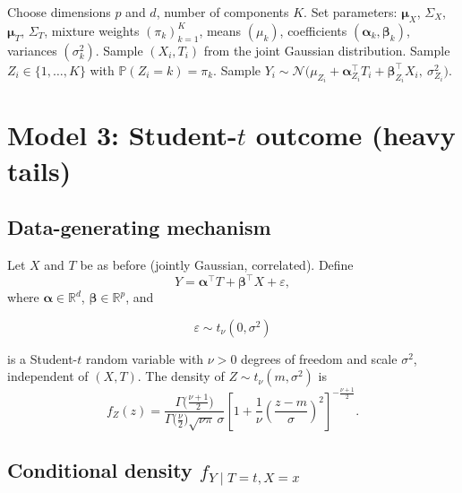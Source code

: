 \documentclass[11pt]{article}
\begin{document}
\begin{algorithm}[h]
\caption{Data generation for the Gaussian mixture model}
\begin{algorithmic}[1]
\STATE Choose dimensions $p$ and $d$, number of components $K$.
\STATE Set parameters: $\bm{\mu}_X$, $\Sigma_X$, $\bm{\mu}_T$, $\Sigma_T$, mixture weights $(\pi_k)_{k=1}^K$, means $(\mu_k)$, coefficients $(\bm{\alpha}_k,\bm{\beta}_k)$, variances $(\sigma_k^2)$.
    \STATE Sample $(X_i, T_i)$ from the joint Gaussian distribution.
    \STATE Sample $Z_i \in \{1,\dots,K\}$ with $\mathbb{P}(Z_i=k) = \pi_k$.
    \STATE Sample $Y_i \sim \mathcal{N}\big(\mu_{Z_i} + \bm{\alpha}_{Z_i}^\top T_i + \bm{\beta}_{Z_i}^\top X_i,\ \sigma_{Z_i}^2\big)$.
\ENDFOR
\end{algorithmic}
\end{algorithm}

\section{Model 3: Student-\texorpdfstring{$t$}{t} outcome (heavy tails)}

\subsection{Data-generating mechanism}

Let $X$ and $T$ be as before (jointly Gaussian, correlated).
Define
\begin{equation}
    Y = \bm{\alpha}^\top T + \bm{\beta}^\top X + \varepsilon,
    \label{eq:model3_Y}
\end{equation}
where $\bm{\alpha} \in \mathbb{R}^d$, $\bm{\beta} \in \mathbb{R}^p$, and


\[
\varepsilon \sim t_\nu(0,\sigma^2)
\]


is a Student-$t$ random variable with $\nu > 0$ degrees of freedom and scale $\sigma^2$, independent of $(X,T)$.
The density of $Z \sim t_\nu(m,\sigma^2)$ is
\begin{equation}
    f_Z(z)
    = \frac{\Gamma\big(\frac{\nu+1}{2}\big)}{\Gamma\big(\frac{\nu}{2}\big)\sqrt{\nu\pi}\,\sigma}
      \left[1 + \frac{1}{\nu}\left(\frac{z-m}{\sigma}\right)^2\right]^{-\frac{\nu+1}{2}}.
    \label{eq:t_density}
\end{equation}

\subsection{Conditional density $f_{Y \mid T=t, X=x}$}
\end{document}

